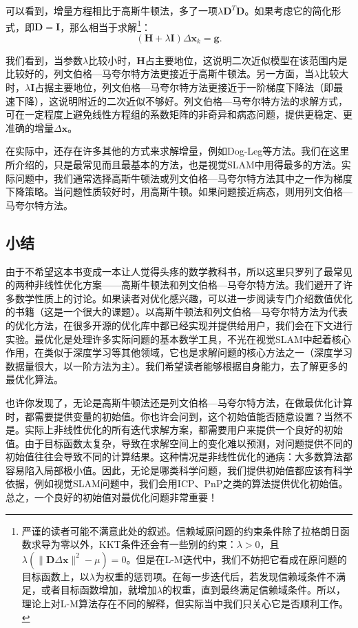 可以看到，增量方程相比于高斯牛顿法，多了一项$\lambda \bm{D}^T \bm{D}$。如果考虑它的简化形式，即$\bm{D}=\bm{I}$，那么相当于求解\footnote{严谨的读者可能不满意此处的叙述。信赖域原问题的约束条件除了拉格朗日函数求导为零以外，KKT条件还会有一些别的约束：$\lambda>0$，且$\lambda(\|\bm{D} \Delta\bm{x}\|^2-\mu)=0$。但是在L-M迭代中，我们不妨把它看成在原问题的目标函数上，以$\lambda$为权重的惩罚项。在每一步迭代后，若发现信赖域条件不满足，或者目标函数增加，就增加$\lambda$的权重，直到最终满足信赖域条件。所以，理论上对L-M算法存在不同的解释，但实际当中我们只关心它是否顺利工作。}：
\begin{displaymath}
\left( \bm{H} +\lambda \bm{I} \right) \Delta \bm{x}_k = \bm{g}.
\end{displaymath}

我们看到，当参数$\lambda$比较小时，$\bm{H}$占主要地位，这说明二次近似模型在该范围内是比较好的，列文伯格—马夸尔特方法更接近于高斯牛顿法。另一方面，当$\lambda$比较大时，$\lambda \bm{I}$占据主要地位，列文伯格—马夸尔特方法更接近于一阶梯度下降法（即最速下降），这说明附近的二次近似不够好。列文伯格—马夸尔特方法的求解方式，可在一定程度上避免线性方程组的系数矩阵的非奇异和病态问题，提供更稳定、更准确的增量$\Delta \bm{x}$。

在实际中，还存在许多其他的方式来求解增量，例如Dog-Leg\cite{Nocedal2006}等方法。我们在这里所介绍的，只是最常见而且最基本的方法，也是视觉SLAM中用得最多的方法。实际问题中，我们通常选择高斯牛顿法或列文伯格—马夸尔特方法其中之一作为梯度下降策略。当问题性质较好时，用高斯牛顿。如果问题接近病态，则用列文伯格—马夸尔特方法。

\subsection{小结}
由于不希望这本书变成一本让人觉得头疼的数学教科书，所以这里只罗列了最常见的两种非线性优化方案——高斯牛顿法和列文伯格—马夸尔特方法。我们避开了许多数学性质上的讨论。如果读者对优化感兴趣，可以进一步阅读专门介绍数值优化的书籍（这是一个很大的课题）\cite{Nocedal2006}。以高斯牛顿法和列文伯格—马夸尔特方法为代表的优化方法，在很多开源的优化库中都已经实现并提供给用户，我们会在下文进行实验。最优化是处理许多实际问题的基本数学工具，不光在视觉SLAM中起着核心作用，在类似于深度学习等其他领域，它也是求解问题的核心方法之一（深度学习数据量很大，以一阶方法为主）。我们希望读者能够根据自身能力，去了解更多的最优化算法。

也许你发现了，无论是高斯牛顿法还是列文伯格—马夸尔特方法，在做最优化计算时，都需要提供变量的初始值。你也许会问到，这个初始值能否随意设置？当然不是。实际上非线性优化的所有迭代求解方案，都需要用户来提供一个良好的初始值。由于目标函数太复杂，导致在求解空间上的变化难以预测，对问题提供不同的初始值往往会导致不同的计算结果。这种情况是非线性优化的通病：大多数算法都容易陷入局部极小值。因此，无论是哪类科学问题，我们提供初始值都应该有科学依据，例如视觉SLAM问题中，我们会用ICP、PnP之类的算法提供优化初始值。总之，一个良好的初始值对最优化问题非常重要！


